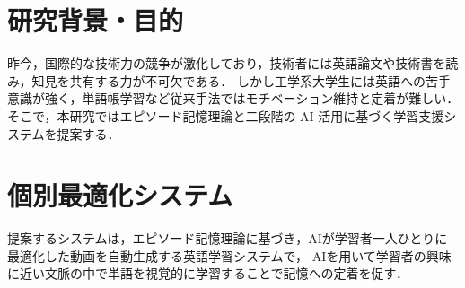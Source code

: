 \documentclass[titlepage,a4paper]{jsarticle}
\begin{document}
\maketitle
\section{研究背景・目的}
昨今，国際的な技術力の競争が激化しており，技術者には英語論文や技術書を読み，知見を共有する力が不可欠である．
しかし工学系大学生には英語への苦手意識が強く，単語帳学習など従来手法ではモチベーション維持と定着が難しい．
そこで，本研究ではエピソード記憶理論と二段階の AI 活用に基づく学習支援システムを提案する．

\section{個別最適化システム}
提案するシステムは，エピソード記憶理論\cite{epi}に基づき，AIが学習者一人ひとりに最適化した動画を自動生成する英語学習システムで，
AIを用いて学習者の興味に近い文脈の中で単語を視覚的に学習することで記憶への定着を促す．
\end{document}
